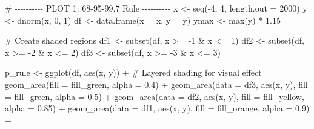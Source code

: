 \documentclass[
  letterpaper,
  DIV=11,
  numbers=noendperiod]{scrreprt}
\newenvironment{Shaded}{\begin{snugshade}}{\end{snugshade}}
\newcommand{\AttributeTok}[1]{\textcolor[rgb]{0.40,0.45,0.13}{#1}}
\newcommand{\CommentTok}[1]{\textcolor[rgb]{0.37,0.37,0.37}{#1}}
\newcommand{\DecValTok}[1]{\textcolor[rgb]{0.68,0.00,0.00}{#1}}
\newcommand{\FloatTok}[1]{\textcolor[rgb]{0.68,0.00,0.00}{#1}}
\newcommand{\FunctionTok}[1]{\textcolor[rgb]{0.28,0.35,0.67}{#1}}
\newcommand{\NormalTok}[1]{\textcolor[rgb]{0.00,0.23,0.31}{#1}}
\newcommand{\OtherTok}[1]{\textcolor[rgb]{0.00,0.23,0.31}{#1}}
\newcommand{\SpecialCharTok}[1]{\textcolor[rgb]{0.37,0.37,0.37}{#1}}
\begin{document}
\begin{Shaded}
\begin{Highlighting}[]
\CommentTok{\# {-}{-}{-}{-}{-}{-}{-}{-}{-}{-} PLOT 1: 68{-}95{-}99.7 Rule {-}{-}{-}{-}{-}{-}{-}{-}{-}{-}}
\NormalTok{x }\OtherTok{\textless{}{-}} \FunctionTok{seq}\NormalTok{(}\SpecialCharTok{{-}}\DecValTok{4}\NormalTok{, }\DecValTok{4}\NormalTok{, }\AttributeTok{length.out =} \DecValTok{2000}\NormalTok{)}
\NormalTok{y }\OtherTok{\textless{}{-}} \FunctionTok{dnorm}\NormalTok{(x, }\DecValTok{0}\NormalTok{, }\DecValTok{1}\NormalTok{)}
\NormalTok{df }\OtherTok{\textless{}{-}} \FunctionTok{data.frame}\NormalTok{(}\AttributeTok{x =}\NormalTok{ x, }\AttributeTok{y =}\NormalTok{ y)}
\NormalTok{ymax }\OtherTok{\textless{}{-}} \FunctionTok{max}\NormalTok{(y) }\SpecialCharTok{*} \FloatTok{1.15}

\CommentTok{\# Create shaded regions}
\NormalTok{df1 }\OtherTok{\textless{}{-}} \FunctionTok{subset}\NormalTok{(df, x }\SpecialCharTok{\textgreater{}=} \SpecialCharTok{{-}}\DecValTok{1} \SpecialCharTok{\&}\NormalTok{ x }\SpecialCharTok{\textless{}=} \DecValTok{1}\NormalTok{)}
\NormalTok{df2 }\OtherTok{\textless{}{-}} \FunctionTok{subset}\NormalTok{(df, x }\SpecialCharTok{\textgreater{}=} \SpecialCharTok{{-}}\DecValTok{2} \SpecialCharTok{\&}\NormalTok{ x }\SpecialCharTok{\textless{}=} \DecValTok{2}\NormalTok{)}
\NormalTok{df3 }\OtherTok{\textless{}{-}} \FunctionTok{subset}\NormalTok{(df, x }\SpecialCharTok{\textgreater{}=} \SpecialCharTok{{-}}\DecValTok{3} \SpecialCharTok{\&}\NormalTok{ x }\SpecialCharTok{\textless{}=} \DecValTok{3}\NormalTok{)}

\NormalTok{p\_rule }\OtherTok{\textless{}{-}} \FunctionTok{ggplot}\NormalTok{(df, }\FunctionTok{aes}\NormalTok{(x, y)) }\SpecialCharTok{+}
  \CommentTok{\# Layered shading for visual effect}
  \FunctionTok{geom\_area}\NormalTok{(}\AttributeTok{fill =}\NormalTok{ fill\_green, }\AttributeTok{alpha =} \FloatTok{0.4}\NormalTok{) }\SpecialCharTok{+}
  \FunctionTok{geom\_area}\NormalTok{(}\AttributeTok{data =}\NormalTok{ df3, }\FunctionTok{aes}\NormalTok{(x, y), }\AttributeTok{fill =}\NormalTok{ fill\_green, }\AttributeTok{alpha =} \FloatTok{0.5}\NormalTok{) }\SpecialCharTok{+}
  \FunctionTok{geom\_area}\NormalTok{(}\AttributeTok{data =}\NormalTok{ df2, }\FunctionTok{aes}\NormalTok{(x, y), }\AttributeTok{fill =}\NormalTok{ fill\_yellow, }\AttributeTok{alpha =} \FloatTok{0.85}\NormalTok{) }\SpecialCharTok{+}
  \FunctionTok{geom\_area}\NormalTok{(}\AttributeTok{data =}\NormalTok{ df1, }\FunctionTok{aes}\NormalTok{(x, y), }\AttributeTok{fill =}\NormalTok{ fill\_orange, }\AttributeTok{alpha =} \FloatTok{0.9}\NormalTok{) }\SpecialCharTok{+}
  

\end{Highlighting}
\end{Shaded}
\end{document}
